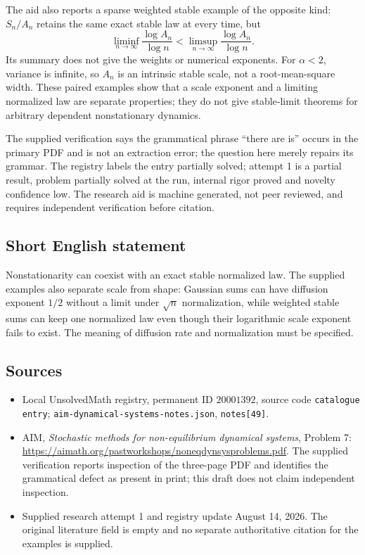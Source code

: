 \documentclass[11pt]{article}
\begin{document}
The aid also reports a sparse weighted stable example of the opposite kind: \(S_n/A_n\) retains the same exact stable law at every time, but
\[
\liminf_{n\to\infty}\frac{\log A_n}{\log n}
<\limsup_{n\to\infty}\frac{\log A_n}{\log n}.
\]
Its summary does not give the weights or numerical exponents. For \(\alpha<2\), variance is infinite, so \(A_n\) is an intrinsic stable scale, not a root-mean-square width. These paired examples show that a scale exponent and a limiting normalized law are separate properties; they do not give stable-limit theorems for arbitrary dependent nonstationary dynamics.

The supplied verification says the grammatical phrase ``there are is'' occurs in the primary PDF and is not an extraction error; the question here merely repairs its grammar. The registry labels the entry partially solved; attempt 1 is a partial result, problem partially solved at the run, internal rigor proved and novelty confidence low. The research aid is machine generated, not peer reviewed, and requires independent verification before citation.
\subsection{Short English statement}
Nonstationarity can coexist with an exact stable normalized law. The supplied examples also separate scale from shape: Gaussian sums can have diffusion exponent \(1/2\) without a limit under \(\sqrt n\) normalization, while weighted stable sums can keep one normalized law even though their logarithmic scale exponent fails to exist. The meaning of diffusion rate and normalization must be specified.
\subsection{Sources}
\begin{itemize}
\item Local UnsolvedMath registry, permanent ID \(20001392\), source code \texttt{catalogue entry}; \texttt{aim-dynamical-systems-notes.json}, \texttt{notes[49]}.
\item AIM, \emph{Stochastic methods for non-equilibrium dynamical systems}, Problem 7: \url{https://aimath.org/pastworkshops/noneqdynsysproblems.pdf}. The supplied verification reports inspection of the three-page PDF and identifies the grammatical defect as present in print; this draft does not claim independent inspection.
\item Supplied research attempt 1 and registry update August 14, 2026. The original literature field is empty and no separate authoritative citation for the examples is supplied.
\end{itemize}
\end{document}
